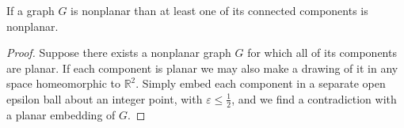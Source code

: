 \documentclass{article}
\begin{document}
%
%	
%	


\begin{lemma} \label{component}
	If a graph $G$ is nonplanar than at least one of its connected components is nonplanar.
\end{lemma}

\begin{proof}
	Suppose there exists a nonplanar graph $G$ for which all of its components are planar. If each component is planar we may also make a drawing of it in any space homeomorphic to $\mathbb R^2$. Simply embed each component in a separate open epsilon ball about an integer point, with $\varepsilon \le \frac12$, and we find a contradiction with a planar embedding of $G$.
\end{proof}
\end{document}
